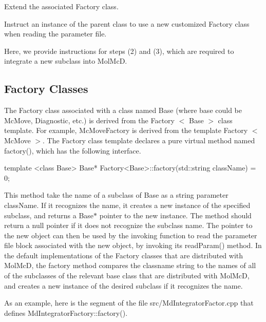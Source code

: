 \begin{DoxyItemize}
\item \-Extend the associated \-Factory class.
\end{DoxyItemize}


\begin{DoxyItemize}
\item \-Instruct an instance of the parent class to use a new customized \-Factory class when reading the parameter file.
\end{DoxyItemize}

\-Here, we provide instructions for steps (2) and (3), which are required to integrate a new subclass into \-Mol\-Mc\-D.\hypertarget{extension_page_factory_custom_sec}{}\subsection{\-Factory Classes}\label{extension_page_factory_custom_sec}
\-The \-Factory class associated with a class named \-Base (where base could be \-Mc\-Move, \-Diagnostic, etc.) is derived from the \-Factory $<$ \-Base $>$ class template. \-For example, \-Mc\-Move\-Factory is derived from the template \-Factory $<$ \-Mc\-Move $>$. \-The \-Factory class template declares a pure virtual method named factory(), which has the following interface. 
\begin{DoxyCode}
   template <class Base>
   Base* Factory<Base>::factory(std::string className) = 0;
\end{DoxyCode}
 \-This method take the name of a subclass of \-Base as a string parameter class\-Name. \-If it recognizes the name, it creates a new instance of the specified subclass, and returns a \-Base$\ast$ pointer to the new instance. \-The method should return a null pointer if it does not recognize the subclass name. \-The pointer to the new object can then be used by the invoking function to read the parameter file block associated with the new object, by invoking its read\-Param() method. \-In the default implementations of the \-Factory classes that are distributed with \-Mol\-Mc\-D, the factory method compares the classname string to the names of all of the subclasses of the relevant base class that are distributed with \-Mol\-Mc\-D, and creates a new instance of the desired subclass if it recognizes the name.

\-As an example, here is the segment of the file src/\-Md\-Integrator\-Factor.\-cpp that defines \-Md\-Integrator\-Factory\-::factory().


